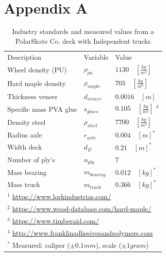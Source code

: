 \onecolumn
\section*{Appendix A}
\begin{table}
\begin{center}
\caption[Industry standard and measured skateboard dimensions]{Industry standards and measured values from a PolarSkate Co. deck with Independent trucks}
\label{t_typical}
\begin{tabular}{l l l}
& & \\ %
\hline
Description & Variable & Value \\
\hline
Wheel density (PU) & $\rho_{pu}$    & $1130 \quad [\frac{kg}{m^3}]$ \footnotemark\\
Hard maple density & $\rho_{maple}$ & $705 \quad [\frac{kg}{m^3}]$ \footnotemark\\
Thickness veneer & $d_{veneer}$ & $0.0016 \quad [m]$ \footnotemark\\
Specific mass PVA glue & $s_{glues}$ & $0.105 \quad [\frac{kg}{m^2}]$ $^{3}$  \footnotemark  \\
Density steel & $\rho_{steel} $ & $ 7700 \quad [\frac{kg}{m^3}] $ \\
Radius axle & $r_{axle} $   & $0.004 \quad [m] ^*$ \\
Width deck & $d_{D}$ & $0.21 \quad [m] ^*$ \\
Number of ply's & $n_{ply}$  & $7 $ \\
Mass bearing & $m_{bearing} $ & $0.012 \quad [kg] ^*$ \\ 
Mass truck   & $m_{truck} $   & $0.366 \quad [kg] ^*$ \\
\hline
\multicolumn{3}{l}{$^{1}$ \scriptsize{\url{https://www.lorkindustrias.com/}}} \\ 
\multicolumn{3}{l}{$^{2}$ \scriptsize{\url{https://www.wood-database.com/hard-maple/}}} \\ 
\multicolumn{3}{l}{$^{3}$ \scriptsize{\url{https://www.timberaid.com/}}} \\ 
\multicolumn{3}{l}{$^{4}$ \scriptsize{\url{http://www.franklinadhesivesandpolymers.com}}} \\ 
\multicolumn{3}{l}{$^{*}$ \scriptsize{Measured: caliper ($\pm 0.1mm$), scale ($\pm 1gram$)}} \\ 
\end{tabular}
\end{center}
\end{table}

